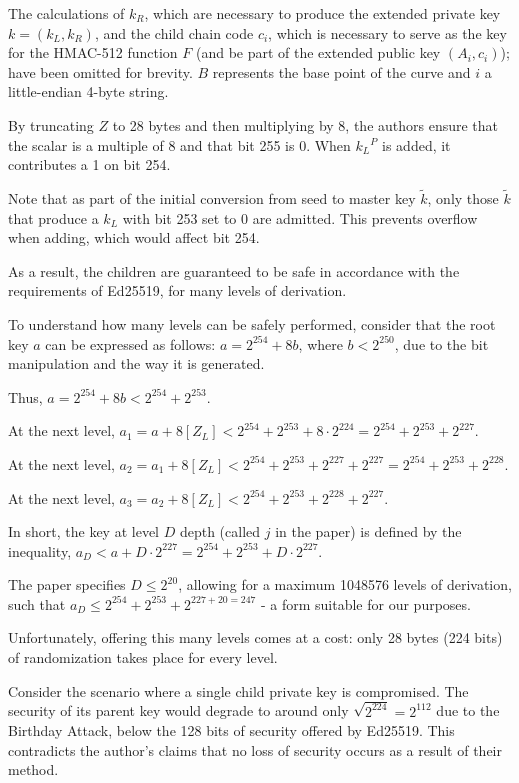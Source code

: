 \documentclass[12pt, a4paper, twocolumn]{article}
\begin{document}
The calculations of $k_R$, which are necessary to produce the extended private key $k = (k_L, k_R)$, and the child chain code $c_i$, which is necessary to serve as the key for the HMAC-512 function $F$ (and be part of the extended public key $(A_i, c_i)$); have been omitted for brevity. $B$ represents the base point of the curve and $i$ a little-endian 4-byte string.

By truncating $Z$ to 28 bytes and then multiplying by 8, the authors ensure that the scalar is a multiple of 8 and that bit 255 is 0. When $k{_L}^P$ is added, it contributes a 1 on bit 254.

Note that as part of the initial conversion from seed to master key $\tilde{k}$, only those $\tilde{k}$ that produce a $k_L$ with bit 253 set to 0 are admitted. This prevents overflow when adding, which would affect bit 254.

As a result, the children are guaranteed to be safe in accordance with the requirements of Ed25519, for many levels of derivation.

To understand how many levels can be safely performed, consider that the root key $a$ can be expressed as follows: $a = 2^{254} + 8b$, where $b < 2^{250}$, due to the bit manipulation and the way it is generated. 

Thus, $a = 2^{254} + 8b < 2^{254} + 2^{253}$.

At the next level, $a_{1} = a + 8[Z_L] < 2^{254} + 2^{253} + 8 \cdot 2^{224} = 2^{254} + 2^{253} + 2^{227}$.

At the next level, $a_{2} = a_{1} + 8[Z_L] < 2^{254} + 2^{253} + 2^{227} + 2^{227} = 2^{254} + 2^{253} + 2^{228}$.

At the next level, $a_{3} = a_{2} + 8[Z_L] < 2^{254} + 2^{253} + 2^{228} + 2^{227}$.

In short, the key at level $D$ depth (called $j$ in the paper) is defined by the inequality, $a_D < a + D\cdot2^{227} = 2^{254} + 2^{253} + D\cdot2^{227}$.

The paper specifies $D \leq 2^{20}$, allowing for a maximum 1048576 levels of derivation, such that $a_{D} \leq 2^{254} + 2^{253} + 2^{227 + 20 = 247}$ - a form suitable for our purposes.

Unfortunately, offering this many levels comes at a cost: only 28 bytes (224 bits) of randomization takes place for every level. 

Consider the scenario where a single child private key is compromised. The security of its parent key would degrade to around only $\sqrt{2^{224}}=2^{112}$ due to the Birthday Attack, below the 128 bits of security offered by Ed25519. This contradicts the author's claims that no loss of security occurs as a result of their method.
\end{document}
